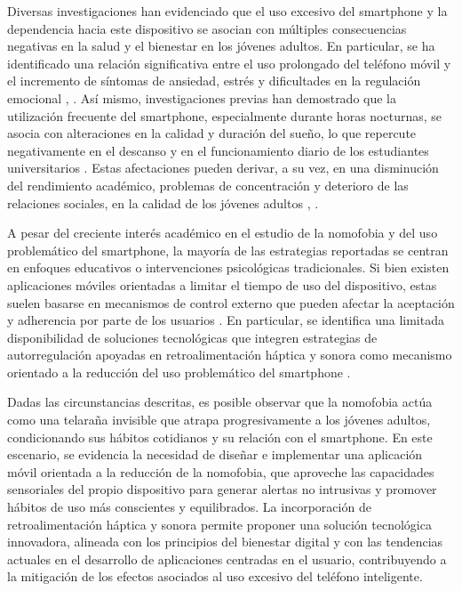 Diversas investigaciones han evidenciado que el uso excesivo del smartphone y la dependencia hacia este dispositivo se asocian con múltiples consecuencias negativas en la salud y el bienestar en los jóvenes adultos. En particular, se ha identificado una relación significativa entre el uso prolongado del teléfono móvil y el incremento de síntomas de ansiedad, estrés y dificultades en la regulación emocional \cite{ELHAI2020105962}, \cite{healthcare11142066}. Así mismo, investigaciones previas han demostrado que la utilización frecuente del smartphone, especialmente durante horas nocturnas, se asocia con alteraciones en la calidad y duración del sueño, lo que repercute negativamente en el descanso y en el funcionamiento diario de los estudiantes universitarios \cite{EXELMANS201693}. Estas afectaciones pueden derivar, a su vez, en una disminución del rendimiento académico, problemas de concentración y deterioro de las relaciones sociales, en la calidad de los jóvenes adultos \cite{SAMAHA2016321}, \cite{LEPP2014343}.

A pesar del creciente interés académico en el estudio de la nomofobia y del uso problemático del smartphone, la mayoría de las estrategias reportadas se centran en enfoques educativos o intervenciones psicológicas tradicionales. Si bien existen aplicaciones móviles orientadas a limitar el tiempo de uso del dispositivo, estas suelen basarse en mecanismos de control externo que pueden afectar la aceptación y adherencia por parte de los usuarios \cite{vanVelthoven2018}. En particular, se identifica una limitada disponibilidad de soluciones tecnológicas que integren estrategias de autorregulación apoyadas en retroalimentación háptica y sonora como mecanismo orientado a la reducción del uso problemático del smartphone \cite{Hampton2025}.

Dadas las circunstancias descritas, es posible observar que la nomofobia actúa como una telaraña invisible que atrapa progresivamente a los jóvenes adultos, condicionando sus hábitos cotidianos y su relación con el smartphone. En este escenario, se evidencia la necesidad de diseñar e implementar una aplicación móvil orientada a la reducción de la nomofobia, que aproveche las capacidades sensoriales del propio dispositivo para generar alertas no intrusivas y promover hábitos de uso más conscientes y equilibrados. La incorporación de retroalimentación háptica y sonora permite proponer una solución tecnológica innovadora, alineada con los principios del bienestar digital y con las tendencias actuales en el desarrollo de aplicaciones centradas en el usuario, contribuyendo a la mitigación de los efectos asociados al uso excesivo del teléfono inteligente.

